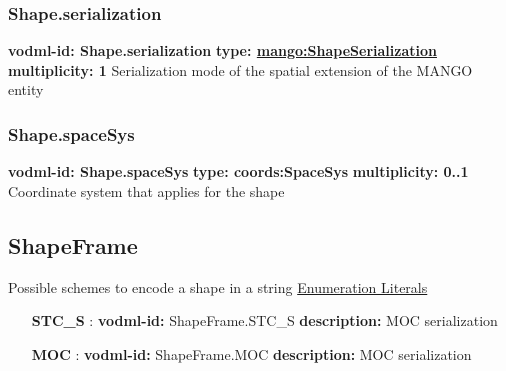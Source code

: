     \subsubsection{Shape.serialization}
    \textbf{vodml-id: Shape.serialization} \newline
    \textbf{type: \hyperref[sect:ShapeSerialization]{mango:ShapeSerialization}} \newline
    \textbf{multiplicity: 1} \newline
    Serialization mode of the spatial extension of the MANGO entity

    \subsubsection{Shape.spaceSys}
    \textbf{vodml-id: Shape.spaceSys} \newline
    \textbf{type: coords:SpaceSys} \newline
    \textbf{multiplicity: 0..1} \newline
    Coordinate system that applies for the shape

  \subsection{ShapeFrame}
    \label{sect:ShapeFrame}
    Possible schemes to encode a shape in a string
    \noindent \underline{Enumeration Literals}
    \vspace{-\parsep}
    \small
    \begin{itemize}
    \item[\textbf{STC\_S}]: \textbf{vodml-id:} ShapeFrame.STC\_S \newline
    \textbf{description:} MOC serialization
    \item[\textbf{MOC}]: \textbf{vodml-id:} ShapeFrame.MOC \newline
    \textbf{description:} MOC serialization
    \end{itemize}
    \normalsize

